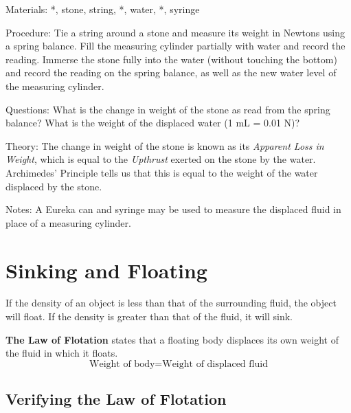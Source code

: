 \begin{multicols}{2}
\begin{description*}
\item[Materials:]{*, stone, string, *, water, *, syringe}
\item[Procedure:]{Tie a string around a stone and measure its weight in Newtons using a spring balance. Fill the measuring cylinder partially with water and record the reading. Immerse the stone fully into the water (without touching the bottom) and record the reading on the spring balance, as well as the new water level of the measuring cylinder.}
\item[Questions:]{What is the change in weight of the stone as read from the spring balance? What is the weight of the displaced water (1 mL = 0.01 N)?}
\item[Theory:]{The change in weight of the stone is known as its \emph{Apparent Loss in Weight}, which is equal to the \emph{Upthrust} exerted on the stone by the water. Archimedes' Principle tells us that this is equal to the weight of the water displaced by the stone.}
\item[Notes:]{A Eureka can and syringe may be used to measure the displaced fluid in place of a measuring cylinder.}
\end{description*}


\section*{Sinking and Floating}
If the density of an object is less than that of the surrounding fluid, the object will float. If the density is greater than that of the fluid, it will sink.

\textbf{The Law of Flotation} states that a floating body displaces its own weight of the fluid in which it floats.
$$\text{Weight of body} = \text{Weight of displaced fluid}$$


\subsection{Verifying the Law of Flotation}


\end{multicols}
